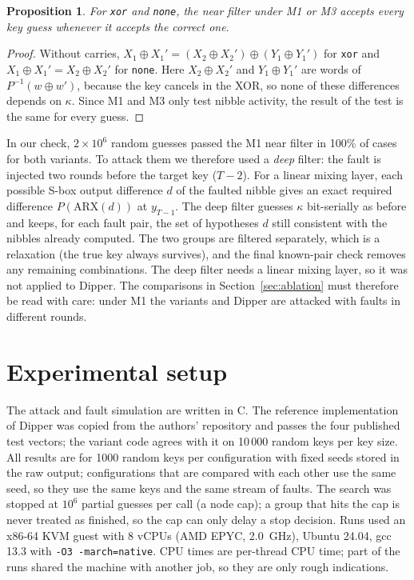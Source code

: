 \documentclass[11pt,a4paper]{article}
\newtheorem{proposition}{Proposition}
\begin{document}
\begin{proposition}\label{prop:zero}
For \texttt{xor} and \texttt{none}, the near filter under M1 or M3 accepts every key guess
whenever it accepts the correct one.
\end{proposition}
\begin{proof}
Without carries, $X_1\oplus X_1' = (X_2\oplus X_2')\oplus(Y_1\oplus Y_1')$ for \texttt{xor} and
$X_1\oplus X_1' = X_2\oplus X_2'$ for \texttt{none}. Here $X_2\oplus X_2'$ and $Y_1\oplus Y_1'$ are
words of $P^{-1}(w\oplus w')$, because the key cancels in the XOR, so none of these differences
depends on $\kappa$. Since M1 and
M3 only test nibble activity, the result of the test is the same for every guess.
\end{proof}

In our check, $2\times10^6$ random guesses passed the M1 near filter in 100\% of cases for both
variants. To attack them we therefore used a \emph{deep} filter: the fault is injected two
rounds before the target key ($T-2$). For a linear mixing layer, each possible S-box output
difference $d$ of the faulted nibble gives an exact required difference
$P(\mathrm{ARX}(d))$ at $y_{T-1}$. The deep filter guesses $\kappa$ bit-serially as before and
keeps, for each fault pair, the set of hypotheses $d$ still consistent with the nibbles already
computed. The two groups are filtered separately, which is a relaxation (the true key always
survives), and the final known-pair check removes any remaining combinations. The deep filter
needs a linear mixing layer, so it was not applied to Dipper. The comparisons in
Section~\ref{sec:ablation} must therefore be read with care: under M1 the variants and Dipper
are attacked with faults in different rounds.

\section{Experimental setup}

The attack and fault simulation are written in C. The reference implementation of Dipper was
copied from the authors' repository and passes the four published test vectors; the variant
code agrees with it on 10\,000 random keys per key size. All results are for 1000 random keys
per configuration with fixed seeds stored in the raw output; configurations that are compared
with each other use the same seed, so they use the same keys and the same stream of faults.
The search was stopped at $10^6$ partial guesses per call (a node cap); a group that hits the
cap is never treated as finished, so the cap can only delay a stop decision. Runs used an x86-64
KVM guest with 8 vCPUs (AMD EPYC, 2.0~GHz), Ubuntu 24.04, gcc 13.3 with
\texttt{-O3 -march=native}. CPU times are per-thread CPU time; part of the runs shared the machine
with another job, so they are only rough indications.
\end{document}
